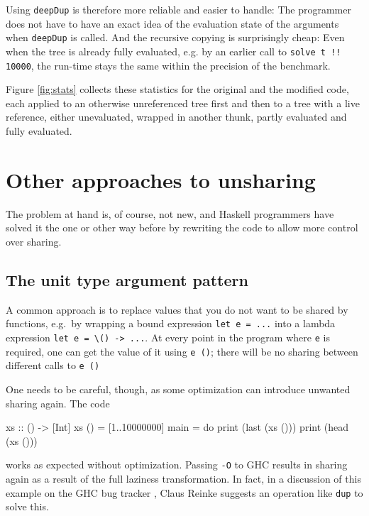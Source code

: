 \documentclass[preprint]{sigplanconf}
\theoremstyle{nonumberplain}
\newcommand{\li}{\lstinline[style=Haskell]}
\newcommand{\ci}{\lstinline[style=Cmm]}
\begin{document}
Using \li-deepDup- is therefore more reliable and easier to handle: The programmer does not have to have an exact idea of the evaluation state of the arguments when \li-deepDup- is called. And the recursive copying is surprisingly cheap: Even when the tree is already fully evaluated, e.g. by an earlier call to \li-solve t !! 10000-, the run-time stays the same within the precision of the benchmark.

Figure \ref{fig:stats} collects these statistics for the original and the modified code, each applied to an otherwise unreferenced tree first and then to a tree with a live reference, either unevaluated, wrapped in another thunk, partly evaluated and fully evaluated.

\section{Other approaches to unsharing}
\label{sec:sourcetrans}

The problem at hand is, of course, not new, and Haskell programmers have solved it the one or other way before by rewriting the code to allow more control over sharing.

\subsection{The unit type argument pattern}

A common approach is to replace values that you do not want to be shared by functions, e.g.\ by wrapping a bound expression \li-let e = ...- into a lambda expression \li!let e = \() -> ...!. At every point in the program where \li-e- is required, one can get the value of it using \li-e ()-; there will be no sharing between different calls to \li-e ()-

One needs to be careful, though, as some optimization can introduce unwanted sharing again. The code
\begin{haskell}
xs :: () -> [Int]
xs () = [1..10000000]
main = do
    print (last (xs ()))
    print (head (xs ()))
\end{haskell}
works as expected without optimization. Passing  \ci!-O! to GHC results in sharing again as a result of the full laziness transformation. In fact, in a discussion of this example on the GHC bug tracker \citep{spaceleakbug}, Claus Reinke suggests an operation like \li-dup- to solve this.
\end{document}
